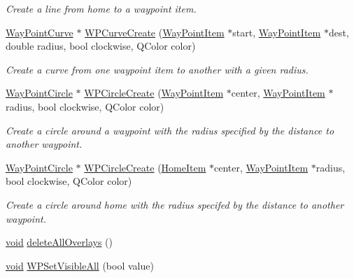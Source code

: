 \begin{DoxyCompactItemize}
\begin{DoxyCompactList}\small\item\em \-Create a line from home to a waypoint item. \end{DoxyCompactList}\item 
\hyperlink{classmapcontrol_1_1_way_point_curve}{\-Way\-Point\-Curve} $\ast$ \hyperlink{group___o_p_map_widget_ga18e61fa069c17e42dd0d6743e1e24ce4}{\-W\-P\-Curve\-Create} (\hyperlink{classmapcontrol_1_1_way_point_item}{\-Way\-Point\-Item} $\ast$start, \hyperlink{classmapcontrol_1_1_way_point_item}{\-Way\-Point\-Item} $\ast$dest, double radius, bool clockwise, \-Q\-Color color)
\begin{DoxyCompactList}\small\item\em \-Create a curve from one waypoint item to another with a given radius. \end{DoxyCompactList}\item 
\hyperlink{classmapcontrol_1_1_way_point_circle}{\-Way\-Point\-Circle} $\ast$ \hyperlink{group___o_p_map_widget_ga8843daa4f0da4fe9343c9cee78bd6a1d}{\-W\-P\-Circle\-Create} (\hyperlink{classmapcontrol_1_1_way_point_item}{\-Way\-Point\-Item} $\ast$center, \hyperlink{classmapcontrol_1_1_way_point_item}{\-Way\-Point\-Item} $\ast$radius, bool clockwise, \-Q\-Color color)
\begin{DoxyCompactList}\small\item\em \-Create a circle around a waypoint with the radius specified by the distance to another waypoint. \end{DoxyCompactList}\item 
\hyperlink{classmapcontrol_1_1_way_point_circle}{\-Way\-Point\-Circle} $\ast$ \hyperlink{group___o_p_map_widget_gad8d5513836ce91c3ab5f84cf81ce2ec8}{\-W\-P\-Circle\-Create} (\hyperlink{classmapcontrol_1_1_home_item}{\-Home\-Item} $\ast$center, \hyperlink{classmapcontrol_1_1_way_point_item}{\-Way\-Point\-Item} $\ast$radius, bool clockwise, \-Q\-Color color)
\begin{DoxyCompactList}\small\item\em \-Create a circle around home with the radius specifed by the distance to another waypoint. \end{DoxyCompactList}\item 
\hyperlink{group___u_a_v_objects_plugin_ga444cf2ff3f0ecbe028adce838d373f5c}{void} \hyperlink{group___o_p_map_widget_gaaad12163774b8b524d7d05ed28b01cae}{delete\-All\-Overlays} ()
\item 
\hyperlink{group___u_a_v_objects_plugin_ga444cf2ff3f0ecbe028adce838d373f5c}{void} \hyperlink{group___o_p_map_widget_ga9a1f7cb8eb3ca498061257be74ed76c6}{\-W\-P\-Set\-Visible\-All} (bool value)

\end{DoxyCompactItemize}
